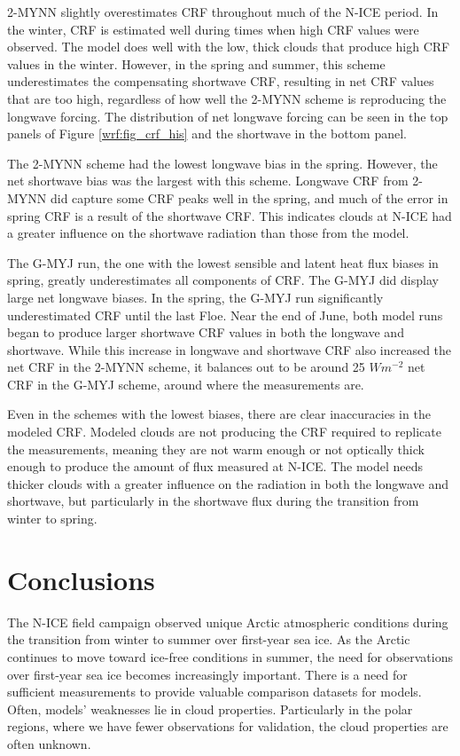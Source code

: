 2-MYNN slightly overestimates CRF throughout much of the N-ICE period. In the winter, CRF is estimated well during times when high CRF values were observed. The model does well with the low, thick clouds that produce high CRF values in the winter. However, in the spring and summer, this scheme underestimates the compensating shortwave CRF, resulting in net CRF values that are too high, regardless of how well the 2-MYNN scheme is reproducing the longwave forcing. The distribution of net longwave forcing can be seen in the top panels of Figure \ref{wrf:fig_crf_his} and the shortwave in the bottom panel.

The 2-MYNN scheme had the lowest longwave bias in the spring. However, the net shortwave bias was the largest with this scheme. Longwave CRF from 2-MYNN did capture some CRF peaks well in the spring, and much of the error in spring CRF is a result of the shortwave CRF. This indicates clouds at N-ICE had a greater influence on the shortwave radiation than those from the model.

The G-MYJ run, the one with the lowest sensible and latent heat flux biases in spring, greatly underestimates all components of CRF. The G-MYJ did display large net longwave biases. In the spring, the G-MYJ run significantly underestimated CRF until the last Floe. Near the end of June, both model runs began to produce larger shortwave CRF values in both the longwave and shortwave. While this increase in longwave and shortwave CRF also increased the net CRF in the 2-MYNN scheme, it balances out to be around 25 $Wm^{-2}$ net CRF in the G-MYJ scheme, around where the measurements are.

Even in the schemes with the lowest biases, there are clear inaccuracies in the modeled CRF. Modeled clouds are not producing the CRF required to replicate the measurements, meaning they are not warm enough or not optically thick enough to produce the amount of flux measured at N-ICE. The model needs thicker clouds with a greater influence on the radiation in both the longwave and shortwave, but particularly in the shortwave flux during the transition from winter to spring.

\section{Conclusions}
The N-ICE field campaign observed unique Arctic atmospheric conditions during the transition from winter to summer over first-year sea ice. As the Arctic continues to move toward ice-free conditions in summer, the need for observations over first-year sea ice becomes increasingly important. There is a need for sufficient measurements to provide valuable comparison datasets for models. Often, models' weaknesses lie in cloud properties. Particularly in the polar regions, where we have fewer observations for validation, the cloud properties are often unknown.

